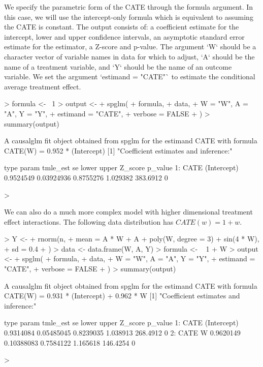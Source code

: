 \documentclass[article]{jss}
\begin{document}
We specify the parametric form of the CATE through the formula argument. In this case, we will use the intercept-only formula which is equivalent to assuming the CATE is constant.  The output consists of:
a coefficient estimate for the intercept, lower and upper confidence intervals, an asymptotic standard error estimate for the estimator, a Z-score and p-value. The argument `W` should be a character vector of variable names in data for which to adjust, `A` should be the name of a treatment variable, and `Y` should be the name of an outcome variable. We set the argument `estimand = "CATE"` to estimate the conditional average treatment effect.
\begin{Schunk}
\begin{Sinput}
> formula <- ~1
> output <-
+   spglm(
+     formula,
+     data,
+     W = "W", A = "A", Y = "Y",
+     estimand = "CATE",
+     verbose = FALSE
+   )
> summary(output)
\end{Sinput}
\begin{Soutput}
A causalglm fit object obtained from spglm for the estimand CATE with formula 
CATE(W) = 0.952 * (Intercept)
[1] "Coefficient estimates and inference:"

   type       param  tmle_est         se     lower    upper  Z_score p_value
1: CATE (Intercept) 0.9524549 0.03924936 0.8755276 1.029382 383.6912       0
\end{Soutput}
\begin{Sinput}
> 
\end{Sinput}
\end{Schunk}
We can also do a much more complex model with higher dimensional treatment effect interactions. The following data distribution has $CATE(w) = 1 + w$.  
\begin{Schunk}
\begin{Sinput}
> Y <-
+   rnorm(n,
+     mean = A * W + A + poly(W, degree = 3) + sin(4 * W),
+     sd = 0.4
+   )
> data <- data.frame(W, A, Y)
> formula <- ~ 1 + W
> output <-
+   spglm(
+     formula,
+     data,
+     W = "W", A = "A", Y = "Y",
+     estimand = "CATE",
+     verbose = FALSE
+   )
> summary(output)
\end{Sinput}
\begin{Soutput}
A causalglm fit object obtained from spglm for the estimand CATE with formula 
CATE(W) = 0.931 * (Intercept) + 0.962 * W
[1] "Coefficient estimates and inference:"

   type       param  tmle_est         se     lower    upper  Z_score p_value
1: CATE (Intercept) 0.9314084 0.05485045 0.8239035 1.038913 268.4912       0
2: CATE           W 0.9620149 0.10388083 0.7584122 1.165618 146.4254       0
\end{Soutput}
\begin{Sinput}
> 
\end{Sinput}
\end{Schunk}
\end{document}
